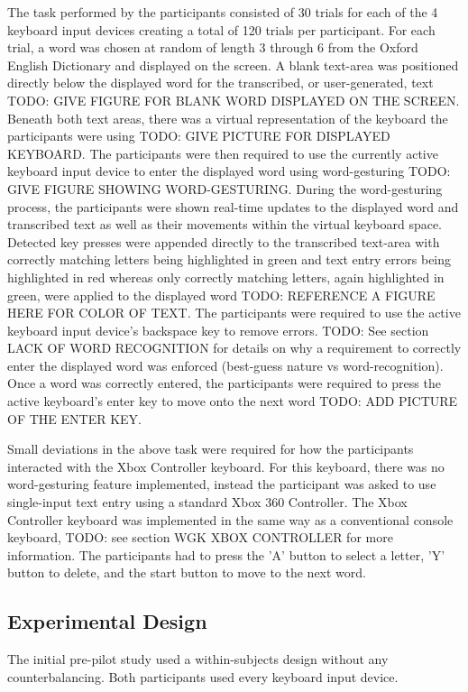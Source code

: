 The task performed by the participants consisted of 30 trials for each of the 4 keyboard input devices creating a total of 120 trials per participant. For each trial, a word was chosen at random of length 3 through 6 from the Oxford English Dictionary and displayed on the screen. A blank text-area was positioned directly below the displayed word for the transcribed, or user-generated, text TODO: GIVE FIGURE FOR BLANK WORD DISPLAYED ON THE SCREEN. Beneath both text areas, there was a virtual representation of the keyboard the participants were using TODO: GIVE PICTURE FOR DISPLAYED KEYBOARD. The participants were then required to use the currently active keyboard input device to enter the displayed word using word-gesturing TODO: GIVE FIGURE SHOWING WORD-GESTURING. During the word-gesturing process, the participants were shown real-time updates to the displayed word and transcribed text as well as their movements within the virtual keyboard space. Detected key presses were appended directly to the transcribed text-area with correctly matching letters being highlighted in green and text entry errors being highlighted in red whereas only correctly matching letters, again highlighted in green, were applied to the displayed word TODO: REFERENCE A FIGURE HERE FOR COLOR OF TEXT. The participants were required to use the active keyboard input device's backspace key to remove errors. TODO: See section LACK OF WORD RECOGNITION for details on why a requirement to correctly enter the displayed word was enforced (best-guess nature vs word-recognition). Once a word was correctly entered, the participants were required to press the active keyboard's enter key to move onto the next word TODO: ADD PICTURE OF THE ENTER KEY.

Small deviations in the above task were required for how the participants interacted with the Xbox Controller keyboard. For this keyboard, there was no word-gesturing feature implemented, instead the participant was asked to use single-input text entry using a standard Xbox 360 Controller. The Xbox Controller keyboard was implemented in the same way as a conventional console keyboard, TODO: see section WGK XBOX CONTROLLER for more information. The participants had to press the 'A' button to select a letter, 'Y' button to delete, and the start button to move to the next word.

\subsection{Experimental Design} \label{pre_experimental_design}
The initial pre-pilot study used a within-subjects design without any counterbalancing. Both participants used every keyboard input device.

